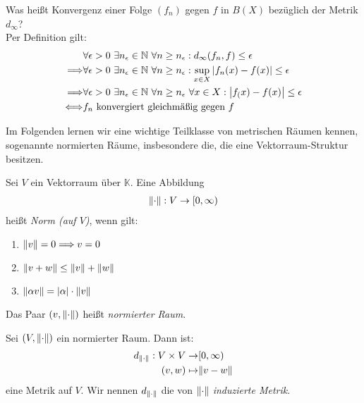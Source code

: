 \begin{Beispiel}{
	Was heißt Konvergenz einer Folge $(f_n)$ gegen $f$ in $B(X)$ bezüglich der 
	Metrik $d_\infty$?\\
	Per Definition gilt:
	\begin{align*}
		& \forall \epsilon > 0 \text{ } \exists n_\epsilon \in \mathbb{N} \text{ }\forall n \geq 
			n_\epsilon: d_\infty(f_n,f) \leq \epsilon \\
		\Longrightarrow & \forall \epsilon > 0 \text{ } \exists n_\epsilon \in \mathbb{N} \text{ }
			\forall n \geq  n_\epsilon: \sup_{x \in X} \abs{f_n(x)-f(x)} \leq 
			\epsilon \\
		\Longrightarrow & \forall \epsilon > 0 \text{ } \exists n_\epsilon \in 
			\mathbb{N} \text{ }\forall n \geq n_\epsilon \text{ }\forall x \in X: 
			\abs{f_(x) -f(x)} \leq \epsilon \\
		\Longleftrightarrow & f_n \text{ konvergiert gleichmäßig gegen } f
	\end{align*}
}\end{Beispiel}

Im Folgenden lernen wir eine wichtige Teilklasse von metrischen Räumen kennen, sogenannte
normierten Räume, insbesondere die, die eine Vektorraum-Struktur besitzen.

\begin{Definition}{%
	Sei $V$ ein Vektorraum über $\mathbb{K}$. Eine Abbildung 
	\begin{align*}
		\norm{\cdot} : V \rightarrow [0, \infty)
	\end{align*}
	heißt \emph{Norm (auf $V$)}, wenn gilt:
	\begin{enumerate}
		\item \label{vl_20_stp_1} $\norm{v} = 0 \Longrightarrow v = 0$
		\item \label{vl_20_stp_2} $ \norm{v + w} \leq \norm{v} + \norm{w}$
		\item \label{vl_20_stp_3} $\norm{\alpha v} = \abs{\alpha}\cdot\norm{v}$
	\end{enumerate}
	Das Paar $(v, \norm{\cdot})$ heißt \emph{normierter Raum}.
}\end{Definition}

\begin{Definition}{%
	Sei $(V, \norm{\cdot})$ ein normierter Raum. Dann ist:
	\begin{align*}
		d_{\norm{\cdot}} : V \times V \rightarrow & [0, \infty) \\
			(v,w) \mapsto & \norm{v-w}
	\end{align*}
	eine Metrik auf $V$. Wir nennen $d_{\norm{\cdot}}$ die von $\norm{\cdot}$ 
	\emph{induzierte Metrik}.
}\end{Definition}

